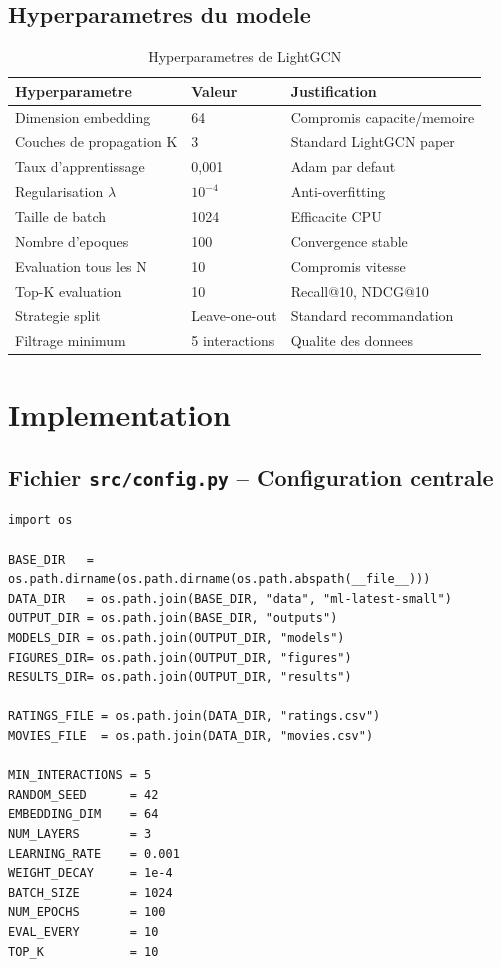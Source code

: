 \documentclass[12pt,a4paper]{report}
\begin{document}
\section{Hyperparametres du modele}

\begin{table}[H]
\centering
\caption{Hyperparametres de LightGCN}
\begin{tabular}{lll}
\toprule
\textbf{Hyperparametre} & \textbf{Valeur} & \textbf{Justification} \\
\midrule
Dimension embedding & 64 & Compromis capacite/memoire \\
Couches de propagation K & 3 & Standard LightGCN paper \\
Taux d'apprentissage & 0,001 & Adam par defaut \\
Regularisation $\lambda$ & $10^{-4}$ & Anti-overfitting \\
Taille de batch & 1024 & Efficacite CPU \\
Nombre d'epoques & 100 & Convergence stable \\
Evaluation tous les N & 10 & Compromis vitesse \\
Top-K evaluation & 10 & Recall@10, NDCG@10 \\
Strategie split & Leave-one-out & Standard recommandation \\
Filtrage minimum & 5 interactions & Qualite des donnees \\
\bottomrule
\end{tabular}
\end{table}

\chapter{Implementation}

\section{Fichier \texttt{src/config.py} -- Configuration centrale}

\begin{lstlisting}[caption={config.py -- Hyperparametres centralises},
  label=lst:config]
import os

BASE_DIR   = os.path.dirname(os.path.dirname(os.path.abspath(__file__)))
DATA_DIR   = os.path.join(BASE_DIR, "data", "ml-latest-small")
OUTPUT_DIR = os.path.join(BASE_DIR, "outputs")
MODELS_DIR = os.path.join(OUTPUT_DIR, "models")
FIGURES_DIR= os.path.join(OUTPUT_DIR, "figures")
RESULTS_DIR= os.path.join(OUTPUT_DIR, "results")

RATINGS_FILE = os.path.join(DATA_DIR, "ratings.csv")
MOVIES_FILE  = os.path.join(DATA_DIR, "movies.csv")

MIN_INTERACTIONS = 5
RANDOM_SEED      = 42
EMBEDDING_DIM    = 64
NUM_LAYERS       = 3
LEARNING_RATE    = 0.001
WEIGHT_DECAY     = 1e-4
BATCH_SIZE       = 1024
NUM_EPOCHS       = 100
EVAL_EVERY       = 10
TOP_K            = 10
\end{lstlisting}
\end{document}
